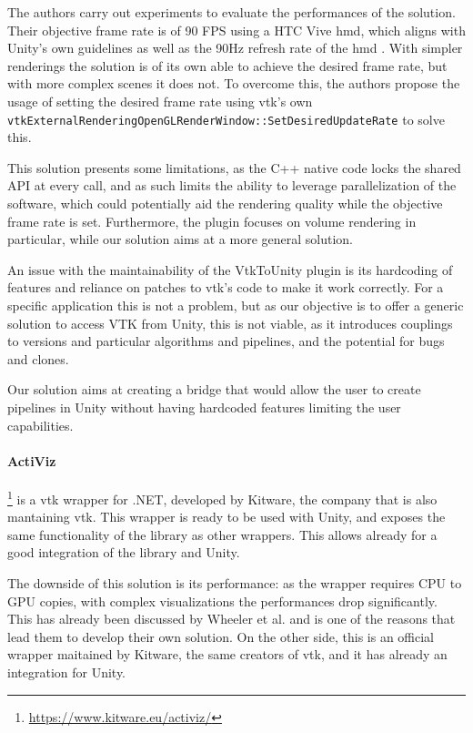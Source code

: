 The authors carry out experiments to evaluate the performances of the solution. Their objective frame rate is of 90 FPS using a HTC Vive \acrfull{hmd}, which aligns with Unity's own guidelines \cite{unity_vr_2020} as well as the 90Hz refresh rate of the \acrshort{hmd} \cite{BuyVIVEH54}. With simpler renderings the solution is of its own able to achieve the desired frame rate, but with more complex scenes it does not. To overcome this, the authors propose the usage of setting the desired frame rate using \acrshort{vtk}'s own \verb|vtkExternalRenderingOpenGLRenderWindow::SetDesiredUpdateRate| to solve this.

This solution presents some limitations, as the C++ native code locks the shared API at every call, and as such limits the ability to leverage parallelization of the software, which could potentially aid the rendering quality while the objective frame rate is set. Furthermore, the plugin focuses on volume rendering in particular, while our solution aims at a more general solution.

An issue with the maintainability of the VtkToUnity plugin is its hardcoding of features and reliance on patches to \acrshort{vtk}'s code to make it work correctly. For a specific application this is not a problem, but as our objective is to offer a generic solution to access VTK from Unity, this is not viable, as it introduces couplings to versions and particular algorithms and pipelines, and the potential for bugs and clones.

Our solution aims at creating a bridge that would allow the user to create pipelines in Unity without having hardcoded features limiting the user capabilities.

\paragraph{ActiViz}\footnote{\url{https://www.kitware.eu/activiz/}} is a \acrshort{vtk} wrapper for .NET, developed by Kitware, the company that is also mantaining \acrshort{vtk}. This wrapper is ready to be used with Unity, and exposes the same functionality of the library as other wrappers. This allows already for a good integration of the library and Unity.

The downside of this solution is its performance: as the wrapper requires CPU to GPU copies, with complex visualizations the performances drop significantly. This has already been discussed by Wheeler et al. \cite{wheeler_virtual_2018} and is one of the reasons that lead them to develop their own solution. On the other side, this is an official wrapper maitained by Kitware, the same creators of \acrshort{vtk}, and it has already an integration for Unity.

